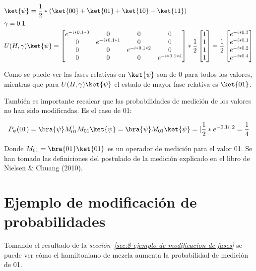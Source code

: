 \begin{align}
  &\ket{\psi} = \frac{1}{2}*(\ket{00} + \ket{01} + \ket{10} + \ket{11}) \\
  &\gamma = 0.1 \\
  &U(H, \gamma) \ket{\psi} =
    \begin{bmatrix}
      e^{-i * 0.1 * 3} & 0                & 0                & 0 \\
      0                & e^{-i * 0.1 * 1} & 0                & 0 \\
      0                & 0                & e^{-i * 0.1 * 2} & 0 \\
      0                & 0                & 0                & e^{-i * 0.1 * 4}
    \end{bmatrix}
    *\frac{1}{2}
    \begin{bmatrix}
      1 \\
      1 \\
      1 \\
      1
    \end{bmatrix} = \frac{1}{2}
    \begin{bmatrix}
      e^{-i * 0.3} \\
      e^{-i * 0.1} \\
      e^{-i * 0.2} \\
      e^{-i * 0.4}
    \end{bmatrix}
\end{align}

Como se puede ver las fases relativas  %
en $\ket{\psi}$ son de 0 para todos los valores, mientras que para $U(H, \gamma) \ket{\psi}$ el estado de mayor fase relativa es $\ket{01}$.

También es importante recalcar que las probabilidades de medición de los valores no han sido modificadas. Es el caso de 01:

\begin{align}
  P_{\psi}(01) = \bra{\psi}M_{01}^\dagger M_{01}\ket{\psi} = \bra{\psi}M_{01}\ket{\psi} = |\frac{1}{2}*e^{-0.1i}|^2 = \frac{1}{4}
\end{align}

Donde $M_{01} = \bra{01}\ket{01}$ es un operador de medición para el valor 01.
Se han tomado las definiciones del postulado de la medición explicado en el libro de Nielsen \& Chuang (2010)\cite{Nielsen_Chuang_2010}.


\section{Ejemplo de modificación de probabilidades}
Tomando el resultado de la \textit{sección~\ref{sec:8-ejemplo de modificacion de fases}} se puede ver cómo el hamiltoniano de mezcla aumenta la probabilidad de medición de 01.

